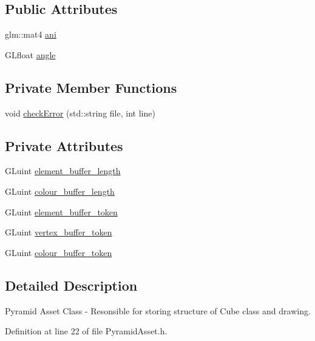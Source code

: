 \subsection*{Public Attributes}
\begin{DoxyCompactItemize}
\item 
glm\+::mat4 \hyperlink{class_pyramid_asset_aa261d31a01a327a581604d199c73de13}{ani}
\item 
G\+Lfloat \hyperlink{class_pyramid_asset_afc05567a64280648f735bf33da5ca345}{angle}
\end{DoxyCompactItemize}
\subsection*{Private Member Functions}
\begin{DoxyCompactItemize}
\item 
void \hyperlink{class_pyramid_asset_a34350044042e0098446dc9e0a260cb70}{check\+Error} (std\+::string file, int line)
\end{DoxyCompactItemize}
\subsection*{Private Attributes}
\begin{DoxyCompactItemize}
\item 
G\+Luint \hyperlink{class_pyramid_asset_a5566105859271b493eab3b5f9c02f866}{element\+\_\+buffer\+\_\+length}
\item 
G\+Luint \hyperlink{class_pyramid_asset_addd87a747d7bd186bd1b3e3070185c69}{colour\+\_\+buffer\+\_\+length}
\item 
G\+Luint \hyperlink{class_pyramid_asset_a6f7e2f50904d2941e33df8eb7f5f9c2d}{element\+\_\+buffer\+\_\+token}
\item 
G\+Luint \hyperlink{class_pyramid_asset_a54d9cec42bc77d07a66e6c1cd55049b0}{vertex\+\_\+buffer\+\_\+token}
\item 
G\+Luint \hyperlink{class_pyramid_asset_a1c82b429f52d92feefacb5755017aec0}{colour\+\_\+buffer\+\_\+token}
\end{DoxyCompactItemize}


\subsection{Detailed Description}
Pyramid Asset Class -\/ Resonsible for storing structure of Cube class and drawing. 

Definition at line 22 of file Pyramid\+Asset.\+h.



